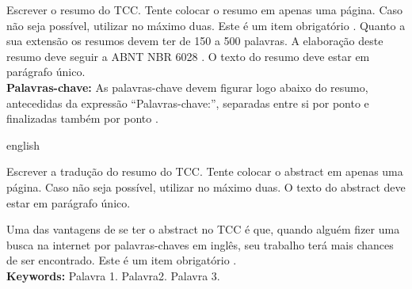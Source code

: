\documentclass[
        oneside,      %
        english,			
        brazil			 
        ]{configcefetmglpd}
\begin{document}
\begin{resumo_cefetmg}
	
\aplicaresumo

Escrever o resumo do TCC. Tente colocar o resumo em apenas uma página. Caso não seja possível, utilizar no máximo duas. Este é um item obrigatório \cite{bib:abnt14724}. Quanto a sua extensão os resumos devem ter de 150 a 500 palavras. A elaboração deste resumo deve seguir a ABNT NBR 6028 \cite{bib:abnt6028}. O texto do resumo deve estar em parágrafo único.\\[18pt]
\textbf{Palavras-chave:} As palavras-chave devem figurar logo abaixo do resumo, antecedidas da expressão “Palavras-chave:”, separadas entre si por ponto e finalizadas também por ponto \cite{bib:abnt6028}. %
\end{resumo_cefetmg}
 
 
\begin{abstract_cefetmg}
 \begin{otherlanguage*}{english}

\aplicaabstract

Escrever a tradução do resumo do TCC. Tente colocar o abstract em apenas uma página. Caso não seja possível, utilizar no máximo duas. O texto do abstract deve estar em parágrafo único.\par
Uma das vantagens de se ter o abstract no TCC é que, quando alguém fizer uma busca na internet por palavras-chaves em inglês, seu trabalho terá mais chances de ser encontrado. Este é um item obrigatório \cite{bib:abnt14724}.\\[18pt]
\textbf{Keywords:} Palavra 1. Palavra2. Palavra 3. %
 \end{otherlanguage*}
\end{abstract_cefetmg}


\printatermo



\figvariadas   %
\listfigvariadas  %
\end{document}
